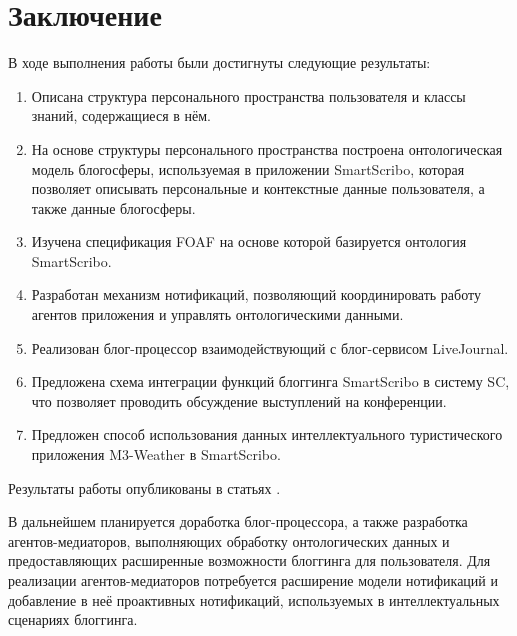 \chapter*{Заключение}
\vspace{-1cm}
В ходе выполнения работы были достигнуты следующие результаты:

\begin{enumerate}
\item
Описана структура персонального пространства пользователя и классы знаний, содержащиеся в нём.

\item
На основе структуры персонального пространства построена онтологическая модель блогосферы, используемая в приложении SmartScribo, которая позволяет описывать персональные и контекстные данные пользователя, а также данные блогосферы.

\item
Изучена спецификация FOAF на основе которой базируется онтология SmartScribo.

\item
Разработан механизм нотификаций, позволяющий координировать работу агентов приложения и управлять онтологическими данными.

\item
Реализован блог-процессор взаимодействующий с блог-сервисом LiveJournal.

\item
Предложена схема интеграции функций блоггинга SmartScribo в систему SC, что позволяет проводить обсуждение выступлений на конференции.

\item
Предложен способ использования данных интеллектуального туристического приложения M3-Weather в SmartScribo.

\end{enumerate}
Результаты работы опубликованы в статьях \cite{scblogging, smartscribo, smartscribo-old}.

В дальнейшем планируется доработка блог-процессора, а также разработка агентов-медиаторов, выполняющих обработку онтологических данных и предоставляющих расширенные возможности блоггинга для пользователя. Для реализации агентов-медиаторов потребуется расширение модели нотификаций и добавление в неё проактивных нотификаций, используемых в интеллектуальных сценариях блоггинга. 
